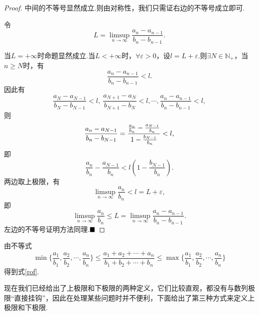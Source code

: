 \begin{proof}
	中间的不等号显然成立.则由对称性，我们只需证右边的不等号成立即可.
	
	令
	$$L=\limsup\limits_{n\to\infty}\dfrac{a_n-a_{n-1}}{b_n-b_{n-1}}.$$
	
	当$L=+\infty$时命题显然成立.当$L<+\infty$时，$\forall\varepsilon>0$，设$l=L+\varepsilon$.则$\exists N\in\mathbb{N}_+$，当$n\geqslant N$时，有
	$$\frac{a_n-a_{n-1}}{b_n-b_{n-1}}<l.$$
	因此有
	$$\frac{a_N-a_{N-1}}{b_N-b_{N-1}}<l,\ \frac{a_{N+1}-a_N}{b_{N+1}-b_N}<l,\cdots,\frac{a_n-a_{n-1}}{b_n-b_{n-1}}<l,$$
	则
	\begin{equation}{\label{rof}}
		\frac{a_n-a_{N-1}}{b_n-b_{N-1}}=\frac{\frac{a_n}{b_n}-\frac{a_{N-1}}{b_n}}{1-\frac{b_{N-1}}{b_n}}<l,
	\end{equation}
	即$$\frac{a_n}{b_n}-\frac{a_{N-1}}{b_n}<l(1-\frac{b_{N-1}}{b_n}).$$
	两边取上极限，有
	$$\limsup\limits_{n\to \infty}\frac{a_n}{b_n}<l=L+\varepsilon,$$
	即
	$$\limsup\limits_{n\to \infty}\frac{a_n}{b_n}\leqslant L=\limsup\limits_{n \to \infty}\frac{a_n-a_{n-1}}{b_n-b_{n-1}}.$$
	左边的不等号证明方法同理.$\hfill\blacksquare$
\end{proof}
\begin{remark}
	由不等式$$\min\{\frac{a_1}{b_1},\frac{a_2}{b_2},\cdots,\frac{a_n}{b_n}\}\leqslant\frac{a_1+a_2+\cdots+a_n}{b_1+b_2+\cdots+b_n}\leqslant \max\{\frac{a_1}{b_1},\frac{a_2}{b_2},\cdots,\frac{a_n}{b_n}\}$$
	得到式\ref{rof}.
\end{remark}
现在我们已经给出了上极限和下极限的两种定义，它们比较直观，都没有与数列极限“直接挂钩”，因此在处理某些问题时并不便利，下面给出了第三种方式来定义上极限和下极限.

